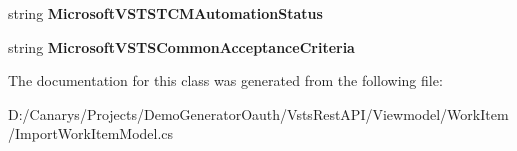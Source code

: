 \begin{DoxyCompactItemize}
string {\bfseries Microsoft\+V\+S\+T\+S\+T\+C\+M\+Automation\+Status}
\item 
\mbox{\label{class_vsts_rest_a_p_i_1_1_viewmodel_1_1_work_item_1_1_import_work_item_model_1_1_fields_a5bddb96d7a6da1b5e98f3914cecc4650}} 
string {\bfseries Microsoft\+V\+S\+T\+S\+Common\+Acceptance\+Criteria}
\end{DoxyCompactItemize}


The documentation for this class was generated from the following file\+:\begin{DoxyCompactItemize}
\item 
D\+:/\+Canarys/\+Projects/\+Demo\+Generator\+Oauth/\+Vsts\+Rest\+A\+P\+I/\+Viewmodel/\+Work\+Item/Import\+Work\+Item\+Model.\+cs\end{DoxyCompactItemize}
